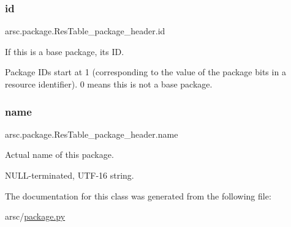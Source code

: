 \subsubsection{\texorpdfstring{id}{id}}
{\footnotesize\ttfamily arsc.\+package.\+Res\+Table\+\_\+package\+\_\+header.\+id}



If this is a base package, its ID. 

Package I\+Ds start at 1 (corresponding to the value of the package bits in a resource identifier). 0 means this is not a base package. \mbox{\label{classarsc_1_1package_1_1ResTable__package__header_a9862f17d7cd35b4662c5928e01d63882}} 
\subsubsection{\texorpdfstring{name}{name}}
{\footnotesize\ttfamily arsc.\+package.\+Res\+Table\+\_\+package\+\_\+header.\+name}



Actual name of this package. 

N\+U\+L\+L-\/terminated, U\+T\+F-\/16 string. 

The documentation for this class was generated from the following file\+:\begin{DoxyCompactItemize}
\item 
arsc/\mbox{\hyperlink{package_8py}{package.\+py}}\end{DoxyCompactItemize}
